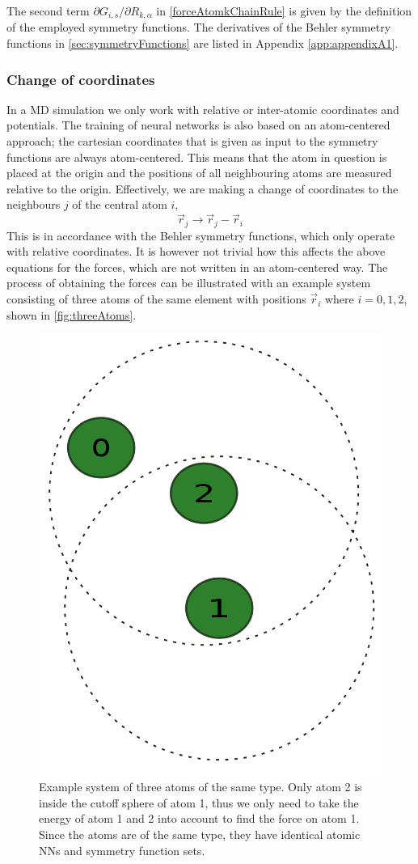 \documentclass[twoside,english]{uiofysmaster}
\begin{document}
The second term $\partial G_{i,s}/\partial R_{k,\alpha}$ in \eqref{forceAtomkChainRule} is given by the 
definition of the employed symmetry functions. 
The derivatives of the Behler symmetry functions in \autoref{sec:symmetryFunctions} are 
listed in Appendix \autoref{app:appendixA1}.

\subsubsection{Change of coordinates}
In a MD simulation we only work with relative or inter-atomic coordinates and potentials. 
The training of neural networks is also based on an atom-centered approach; the cartesian coordinates
that is given as input to the symmetry functions are always atom-centered. This means that the atom
in question is placed at the origin and the positions of all neighbouring atoms are measured relative to 
the origin. Effectively, we are making a change of coordinates to the neighbours $j$ of the central atom $i$,
\begin{equation}
 \vec{r}_j \rightarrow \vec{r}_j - \vec{r}_i
 \label{changeOfCoordinates}
\end{equation}
This is in accordance with the Behler symmetry functions, which only operate with relative coordinates. 
It is however not trivial how this affects the above equations for the forces, which are not written in 
an atom-centered way. The process of obtaining the forces can be illustrated with an example system
consisting of three atoms of the same element with positions $\vec{r}_i$ where $i = 0,1,2$, shown in \autoref{fig:threeAtoms}.
\begin{figure}
\begin{center}
  \includegraphics[width = 0.4\linewidth]{Figures/Implementation/3atoms.pdf}
  \caption{Example system of three atoms of the same type. Only atom 2 is inside the cutoff sphere of atom 1, thus we only need to 
	   take the energy of atom 1 and 2 into account to find the force on atom 1. Since the atoms are of the same type,
	   they have identical atomic NNs and symmetry function sets.}
  \label{fig:threeAtoms}
  \end{center}
\end{figure}
\end{document}
